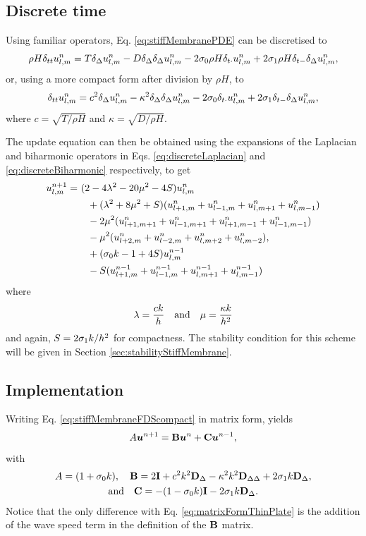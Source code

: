 {\subsection{Discrete time}
Using familiar operators, Eq. \eqref{eq:stiffMembranePDE} can be discretised to 
\begin{equation}\label{eq:stiffMembraneFDS}
    \rho H \delta_{tt} u_{l,m}^n = T\delta_{\Delta}u_{l,m}^n- D \delta_{\Delta}\delta_{\Delta}u_{l,m}^n - 2\sigma_{0} \rho H \delta_{t\cdot} u_{l,m}^n + 2 \sigma_{1} \rho H \delta_{t-} \delta_{\Delta}u_{l,m}^n,
\end{equation}
or, using a more compact form after division by $\rho H$, to
\begin{equation}\label{eq:stiffMembraneFDScompact}
    \delta_{tt} u_{l,m}^n = c^2\delta_{\Delta}u_{l,m}^n- \kappa^2 \delta_{\Delta}\delta_{\Delta}u_{l,m}^n - 2\sigma_{0} \delta_{t\cdot} u_{l,m}^n + 2 \sigma_{1} \delta_{t-} \delta_{\Delta}u_{l,m}^n,
\end{equation}
where $c = \sqrt{T / \rho H}$ and $\kappa = \sqrt{D / \rho H}$.

The update equation can then be obtained using the expansions of the Laplacian and biharmonic operators in Eqs. \eqref{eq:discreteLaplacian} and \eqref{eq:discreteBiharmonic} respectively, to get
\begin{equation}\label{eq:stiffMembraneUpdate}
    \begin{aligned}
    u_{l,m}^{n+1} =&\ (2 - 4\lambda^2 - 20\mu^2 - 4S)u_{l,m}^n \\
    &\ \ \ +(\lambda^2 + 8\mu^2 + S)(u_{l+1, m}^n + u_{l-1, m}^n+u_{l, m+1}^n+u_{l, m-1}^n)\\
    &\ \ \ -2\mu^2(u_{l+1, m+1}^n + u_{l-1, m+1}^n+u_{l+1, m-1}^n+u_{l-1, m-1}^n)\\
    &\ \ \ -\mu^2(u_{l+2, m}^n + u_{l-2, m}^n+u_{l, m+2}^n+u_{l, m-2}^n),\\
    &\ \ \ + (\sigma_{0} k  - 1 + 4S) u_{l,m}^{n-1}\\
    &\ \ \ - S (u_{l+1, m}^{n-1} + u_{l-1, m}^{n-1}+u_{l, m+1}^{n-1}+u_{l, m-1}^{n-1})
    \end{aligned}
\end{equation}
where 
\begin{equation}\label{eq:lambdaMuStiffMembrane}
    \lambda = \frac{c k}{h}\quad \text{and} \quad \mu = \frac{\kappa k}{h^2}
\end{equation}
and again, $S = 2\sigma_{1} k / h^2$ for compactness. The stability condition for this scheme will be given in Section \ref{sec:stabilityStiffMembrane}.

\subsection{Implementation}
Writing Eq. \eqref{eq:stiffMembraneFDScompact} in matrix form, yields 
\begin{equation}
    A\boldsymbol{u}^{n+1} = \mathbf{B}\boldsymbol{u}^n + \mathbf{C}\boldsymbol{u}^{n-1},
\end{equation}
with
\begin{gather*}
    A = (1+\sigma_{0} k),\quad \mathbf{B} = 2\mathbf{I} + c^2k^2 \mathbf{D}_\Delta - \kappa^2 k^2 \mathbf{D}_{\Delta\Delta} + 2 \sigma_{1} k\mathbf{D}_\Delta, \\
    \text{and}\quad \mathbf{C} = -(1-\sigma_{0} k)\mathbf{I} - 2\sigma_{1} k \mathbf{D}_\Delta.
\end{gather*}
Notice that the only difference with Eq. \eqref{eq:matrixFormThinPlate} is the addition of the wave speed term in the definition of the $\mathbf{B}$ matrix. 

}
